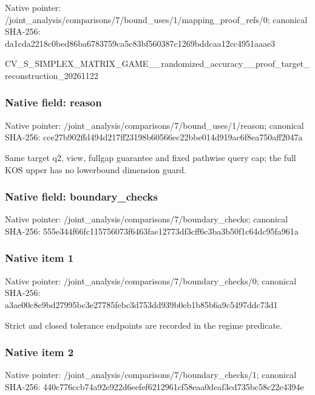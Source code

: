 \documentclass[10pt,a4paper]{article}
\begin{document}
Native pointer: /joint\_analysis/comparis\allowbreak{}ons/7/bound\_uses/1/mappi\allowbreak{}ng\_proof\_refs/0; canonical SHA-256: da1cda2218c0bed86ba67837\allowbreak{}59ca5c83bf560387c1269bdd\allowbreak{}caa12cc4951aaae3


CV\_S\_SIMPLEX\_MATRIX\_GAME\allowbreak{}\_\_randomized\_accuracy\_\_p\allowbreak{}roof\_target\_reconstructi\allowbreak{}on\_20261122


\subsubsection{Native field: reason}


Native pointer: /joint\_analysis/comparis\allowbreak{}ons/7/bound\_uses/1/reaso\allowbreak{}n; canonical SHA-256: cce27b902ffd494d217ff231\allowbreak{}98b60566ec22bbe014d919ac\allowbreak{}6f8ea750aff2047a


Same target q2, view, fullgap guarantee and fixed pathwise query cap; the full KOS upper has no lowerbound dimension guard.


\subsubsection{Native field: boundary\_checks}


Native pointer: /joint\_analysis/comparis\allowbreak{}ons/7/boundary\_checks; canonical SHA-256: 555e344f66fc115756073f64\allowbreak{}63fae12773df3cff6c3ba3b5\allowbreak{}0f1c64dc95fa961a



\subsubsection{Native item 1}


Native pointer: /joint\_analysis/comparis\allowbreak{}ons/7/boundary\_checks/0; canonical SHA-256: a3ae00c8e9bd27995bc3e277\allowbreak{}85febc3d753dd939b0eb1b85\allowbreak{}b6a9c5497ddc73d1


Strict and closed tolerance endpoints are recorded in the regime predicate.


\subsubsection{Native item 2}


Native pointer: /joint\_analysis/comparis\allowbreak{}ons/7/boundary\_checks/1; canonical SHA-256: 440c776ccb74a92e922d6eef\allowbreak{}ef6212961cf58eaa0deaf3cd\allowbreak{}735bc58c22e4394e
\end{document}
